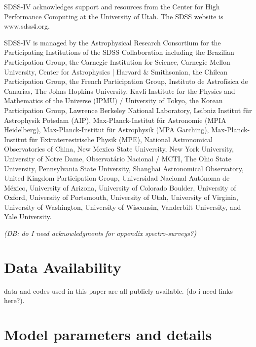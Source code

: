 \documentclass[fleqn,
referee, %
usenatbib]{mnras}
\newcommand{\dbadd}[1]{{\color{Thistle} #1}}
\newcommand{\dbnote}[1]{ {\color{Thistle} \textit{\small (DB: #1)}} }
\begin{document}
SDSS-IV acknowledges support and 
resources from the Center for High 
Performance Computing  at the 
University of Utah. The SDSS 
website is www.sdss4.org.

SDSS-IV is managed by the 
Astrophysical Research Consortium 
for the Participating Institutions 
of the SDSS Collaboration including 
the Brazilian Participation Group, 
the Carnegie Institution for Science, 
Carnegie Mellon University, Center for 
Astrophysics | Harvard \& 
Smithsonian, the Chilean Participation 
Group, the French Participation Group, 
Instituto de Astrof\'isica de 
Canarias, The Johns Hopkins 
University, Kavli Institute for the 
Physics and Mathematics of the 
Universe (IPMU) / University of 
Tokyo, the Korean Participation Group, 
Lawrence Berkeley National Laboratory, 
Leibniz Institut f\"ur Astrophysik 
Potsdam (AIP),  Max-Planck-Institut 
f\"ur Astronomie (MPIA Heidelberg), 
Max-Planck-Institut f\"ur 
Astrophysik (MPA Garching), 
Max-Planck-Institut f\"ur 
Extraterrestrische Physik (MPE), 
National Astronomical Observatories of 
China, New Mexico State University, 
New York University, University of 
Notre Dame, Observat\'ario 
Nacional / MCTI, The Ohio State 
University, Pennsylvania State 
University, Shanghai 
Astronomical Observatory, United 
Kingdom Participation Group, 
Universidad Nacional Aut\'onoma 
de M\'exico, University of Arizona, 
University of Colorado Boulder, 
University of Oxford, University of 
Portsmouth, University of Utah, 
University of Virginia, University 
of Washington, University of 
Wisconsin, Vanderbilt University, 
and Yale University.

\dbnote{do I need acknowledgments for appendix spectro-surveys?}

\section*{Data Availability}

\dbadd{data and codes used in this paper are all publicly available. (do i need links here?). }







\appendix


\section{Model parameters and details}
\end{document}
